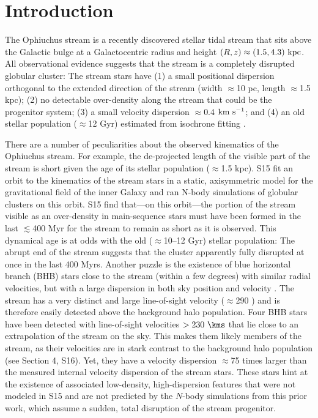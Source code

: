 \documentclass[letterpaper,12pt,preprint]{aastex}
\begin{document}

\section{Introduction}\label{sec:introduction}

The Ophiuchus stream \citep{bernard14, sesar15a} is a recently discovered stellar tidal stream that sits above the Galactic bulge at a Galactocentric radius and height $(R,z) \approx (1.5, 4.3)~{\rm kpc}$. All observational evidence suggests that the stream is a completely disrupted globular cluster: The stream stars have (1) a small positional dispersion orthogonal to the extended direction of the stream (width $\approx$10 pc, length $\approx$1.5 kpc); (2) no detectable over-density along the stream that could be the progenitor system; (3) a small velocity dispersion $\approx$0.4 ${\rm km}~{\rm s}^{-1}$; and (4) an old stellar population ($\approx$12 Gyr) estimated from isochrone fitting \citep[][hereafter S15]{sesar15a}.

There are a number of peculiarities about the observed kinematics of the Ophiuchus stream. For example, the de-projected length of the visible part of the stream is short given the age of its stellar population ($\approx$1.5 kpc). S15 fit an orbit to the kinematics of the stream stars in a static, axisymmetric model for the gravitational field of the inner Galaxy and ran N-body simulations of globular clusters on this orbit. S15 find that---on this orbit---the portion of the stream visible as an over-density in main-sequence stars must have been formed in the last $\lesssim$400 Myr for the stream to remain as short as it is observed. This dynamical age is at odds with the old ($\approx$10--12 Gyr) stellar population: The abrupt end of the stream suggests that the cluster apparently fully disrupted at once in the last 400 Myrs. Another puzzle is the existence of blue horizontal branch (BHB) stars close to the stream (within a few degrees) with similar radial velocities, but with a large dispersion in both sky position and velocity \citep[][hereafter S16]{sesar16}. The stream has a very distinct and large line-of-sight velocity ($\approx$290 \kms) and is therefore easily detected above the background halo population. Four BHB stars have been detected with line-of-sight velocities $>230~\kms$ that lie close to an extrapolation of the stream on the sky. This makes them likely members of the stream, as their velocities are in stark contrast to the background halo population (see Section 4, S16). Yet, they have a velocity dispersion $\approx$75 times larger than the measured internal velocity dispersion of the stream stars. These stars hint at the existence of associated low-density, high-dispersion features that were not modeled in S15 and are not predicted by the $N$-body simulations from this prior work, which assume a sudden, total disruption of the stream progenitor.
\end{document}

